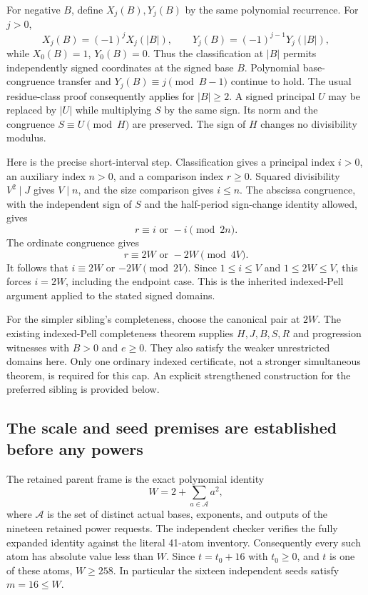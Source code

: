 For negative $B$, define $X_j(B),Y_j(B)$ by the same polynomial
recurrence. For $j>0$,
\[
 X_j(B)=(-1)^jX_j(|B|),\qquad
 Y_j(B)=(-1)^{j-1}Y_j(|B|),
\]
while $X_0(B)=1$, $Y_0(B)=0$. Thus the classification at $|B|$
permits independently signed coordinates at the signed base $B$.
Polynomial base-congruence transfer and
$Y_j(B)\equiv j\pmod{B-1}$ continue to hold. The usual
residue-class proof consequently applies for $|B|\geq2$.
A signed principal $U$ may be replaced by $|U|$ while multiplying
$S$ by the same sign. Its norm and the congruence $S\equiv U\pmod H$
are preserved. The sign of $H$ changes no divisibility modulus.

Here is the precise short-interval step. Classification gives a
principal index $i>0$, an auxiliary index $n>0$, and a comparison
index $r\geq0$. Squared divisibility $V^2\mid J$ gives $V\mid n$,
and the size comparison gives $i\leq n$. The abscissa congruence,
with the independent sign of $S$ and the half-period sign-change
identity allowed, gives
\[
 r\equiv i\text{ or }-i\pmod{2n}.
\]
The ordinate congruence gives
\[
 r\equiv2W\text{ or }-2W\pmod{4V}.
\]
It follows that $i\equiv2W$ or $-2W\pmod{2V}$. Since
$1\leq i\leq V$ and $1\leq2W\leq V$, this forces $i=2W$,
including the endpoint case. This is the inherited indexed-Pell
argument applied to the stated signed domains.

For the simpler sibling's completeness, choose the canonical pair
at $2W$. The existing indexed-Pell completeness theorem supplies
$H,J,B,S,R$ and progression witnesses with $B>0$ and $e\geq0$.
They also satisfy the weaker unrestricted domains here. Only one
ordinary indexed certificate, not a stronger simultaneous theorem,
is required for this cap. An explicit strengthened construction for
the preferred sibling is provided below.

\subsection{The scale and seed premises are established before any powers}
The retained parent frame is the exact polynomial identity
\[
 W=2+\sum_{a\in\mathcal A}a^2,
\]
where $\mathcal A$ is the set of distinct actual bases, exponents,
and outputs of the nineteen retained power requests. The independent
checker verifies the fully expanded identity against the literal
41-atom inventory. Consequently every such atom has absolute value
less than $W$. Since $t=t_0+16$ with $t_0\geq0$, and $t$ is one
of these atoms, $W\geq258$. In particular the sixteen independent
seeds satisfy $m=16\leq W$.

